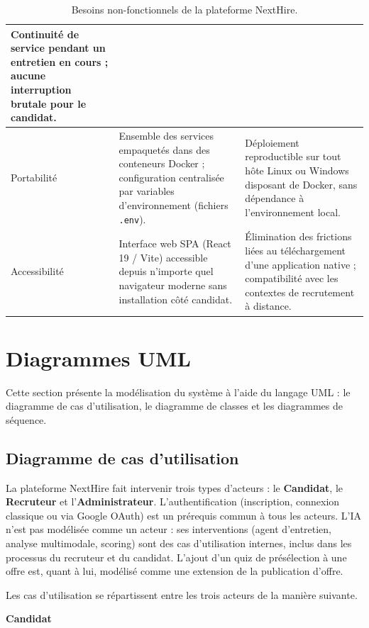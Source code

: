 \begin{table}[H]
\begin{tabularx}{\textwidth}{|>{\raggedright\arraybackslash}p{2.4cm}|>{\raggedright\arraybackslash}X|>{\raggedright\arraybackslash}X|}
    Continuité de service pendant un entretien en cours ; aucune interruption brutale pour le candidat. \\
    \hline
    Portabilité & Ensemble des services empaquetés dans des conteneurs Docker ; configuration centralisée par variables d'environnement (fichiers \texttt{.env}). &
    Déploiement reproductible sur tout hôte Linux ou Windows disposant de Docker, sans dépendance à l'environnement local. \\
    \hline
    Accessibilité & Interface web SPA (React\,19 / Vite) accessible depuis n'importe quel navigateur moderne sans installation côté candidat. &
    Élimination des frictions liées au téléchargement d'une application native ; compatibilité avec les contextes de recrutement à distance. \\
    \hline
  \end{tabularx}
  \caption{Besoins non-fonctionnels de la plateforme NextHire.}
  \label{tab:bnf}
\end{table}

\section{Diagrammes UML}

Cette section présente la modélisation du système à l'aide du langage UML : le diagramme de cas d'utilisation, le diagramme de classes et les diagrammes de séquence.

\subsection{Diagramme de cas d'utilisation}

La plateforme NextHire fait intervenir trois types d'acteurs : le \textbf{Candidat}, le \textbf{Recruteur} et l'\textbf{Administrateur}. L'authentification (inscription, connexion classique ou via Google OAuth) est un prérequis commun à tous les acteurs. L'IA n'est pas modélisée comme un acteur : ses interventions (agent d'entretien, analyse multimodale, scoring) sont des cas d'utilisation internes, inclus dans les processus du recruteur et du candidat. L'ajout d'un quiz de présélection à une offre est, quant à lui, modélisé comme une extension de la publication d'offre.

Les cas d’utilisation se répartissent entre les trois acteurs de la manière suivante.

\noindent\textbf{Candidat}

